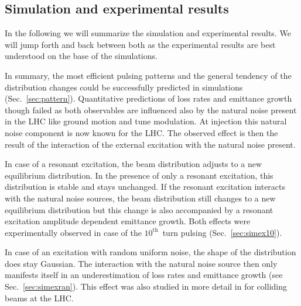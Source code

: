 \documentclass[%
 reprint,
 amsmath,amssymb,
 aps,
prstab,
]{revtex4-1}
\begin{document}
\subsection{Simulation and experimental results\label{sec:simex}}
In the following we will summarize the simulation and experimental results. We will jump forth and back between both as the experimental results are best understood on the base of the simulations.

In summary, the most efficient pulsing patterns and the general tendency of the distribution changes could be successfully predicted in simulations (Sec.~\ref{sec:pattern}). Quantitative predictions of loss rates and emittance growth though failed as both observables are influenced also by the natural noise present in the LHC like ground motion and tune modulation. At injection this natural noise component is now known for the LHC. The observed effect is then the result of the interaction of the external excitation with the natural noise present.

In case of a resonant excitation, the beam distribution adjusts to a new equilibrium distribution. In the presence of only a resonant excitation, this distribution is stable and stays unchanged. If the resonant excitation interacts with the natural noise sources, the beam distribution still changes to a new equilibrium distribution but this change is also accompanied by a resonant excitation amplitude dependent emittance growth. Both effects were experimentally observed in case of the $10^{\mathrm{th}}$~turn pulsing (Sec.~\ref{sec:simex10}).

In case of an excitation with random uniform noise, the shape of the distribution does stay Gaussian. The interaction with the natural noise source then only manifests itself in an underestimation of loss rates and emittance growth (see Sec.~\ref{sec:simexran}). This effect was also studied in more detail in \cite{md1433_noise_top_energy,md_noise_bbLHC} for colliding beams at the LHC.
\end{document}
